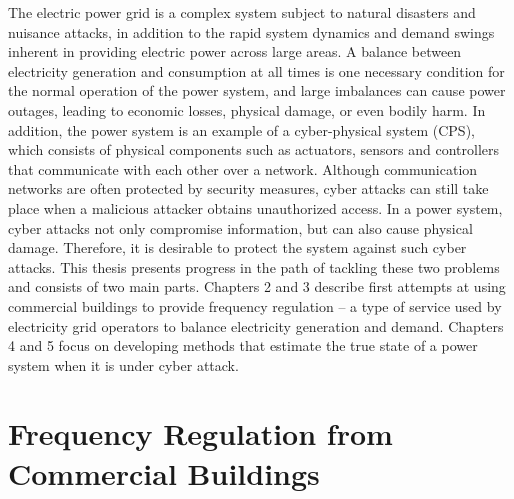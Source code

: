 \documentclass[../thesis.tex]{subfiles}
\begin{document}
The electric power grid is a complex system subject to natural disasters and nuisance attacks, in addition to the rapid system dynamics and demand swings inherent in providing electric power across large areas.
A balance between electricity generation and consumption at all times is one necessary condition for the normal operation of the power system, and large imbalances can cause power outages, leading to economic losses, physical damage, or even bodily harm.
In addition, the power system is an example of a cyber-physical system (CPS), which consists of physical components such as actuators, sensors and controllers that communicate with each other over a network. 
Although communication networks are often protected by security measures, cyber attacks can still take place when a malicious attacker obtains unauthorized access. %
In a power system, cyber attacks not only compromise information, but can also cause physical damage. 
Therefore, it is desirable to protect the system against such cyber attacks.
This thesis presents progress in the path of tackling these two problems and consists of two main parts.
Chapters 2 and 3 describe first attempts at using commercial buildings to provide frequency regulation -- a type of service used by electricity grid operators to balance electricity generation and demand. 
Chapters 4 and 5 focus on developing methods that estimate the true state of a power system when it is under cyber attack.




\section{Frequency Regulation from Commercial Buildings}
\end{document}
